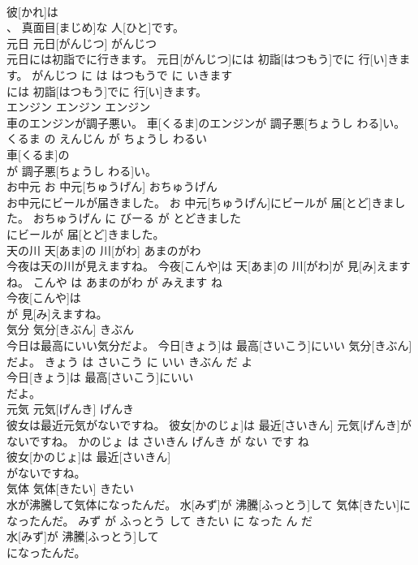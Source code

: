 \documentclass[8pt]{extreport}
\begin{document}
\begin{CJK}{UTF8}{min}
\\	彼[かれ]は
\\	、 真面目[まじめ]な 人[ひと]です。			
\\	元日	元日[がんじつ]	がんじつ	
\\	元日には初詣でに行きます。	元日[がんじつ]には 初詣[はつもう]でに 行[い]きます。	がんじつ に は はつもうで に いきます	
\\	には 初詣[はつもう]でに 行[い]きます。			
\\	エンジン	エンジン	エンジン	
\\	車のエンジンが調子悪い。	車[くるま]のエンジンが 調子悪[ちょうし わる]い。	くるま の えんじん が ちょうし わるい	
\\	車[くるま]の
\\	が 調子悪[ちょうし わる]い。			
\\	お中元	お 中元[ちゅうげん]	おちゅうげん	
\\	お中元にビールが届きました。	お 中元[ちゅうげん]にビールが 届[とど]きました。	おちゅうげん に びーる が とどきました	
\\	にビールが 届[とど]きました。			
\\	天の川	天[あま]の 川[がわ]	あまのがわ	
\\	今夜は天の川が見えますね。	今夜[こんや]は 天[あま]の 川[がわ]が 見[み]えますね。	こんや は あまのがわ が みえます ね	
\\	今夜[こんや]は
\\	が 見[み]えますね。			
\\	気分	気分[きぶん]	きぶん	
\\	今日は最高にいい気分だよ。	今日[きょう]は 最高[さいこう]にいい 気分[きぶん]だよ。	きょう は さいこう に いい きぶん だ よ	
\\	今日[きょう]は 最高[さいこう]にいい
\\	だよ。			
\\	元気	元気[げんき]	げんき	
\\	彼女は最近元気がないですね。	彼女[かのじょ]は 最近[さいきん] 元気[げんき]がないですね。	かのじょ は さいきん げんき が ない です ね	
\\	彼女[かのじょ]は 最近[さいきん]
\\	がないですね。			
\\	気体	気体[きたい]	きたい	
\\	水が沸騰して気体になったんだ。	水[みず]が 沸騰[ふっとう]して 気体[きたい]になったんだ。	みず が ふっとう して きたい に なった ん だ	
\\	水[みず]が 沸騰[ふっとう]して
\\	になったんだ。			

\end{CJK}
\end{document}
